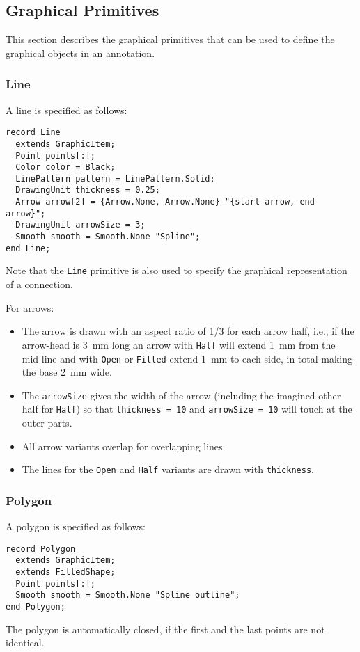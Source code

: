\subsection{Graphical Primitives}\label{graphical-primitives}

This section describes the graphical primitives that can be used to define the graphical objects in an annotation.

\subsubsection{Line}\label{line}

A line is specified as follows:
\begin{lstlisting}[language=modelica]
record Line
  extends GraphicItem;
  Point points[:];
  Color color = Black;
  LinePattern pattern = LinePattern.Solid;
  DrawingUnit thickness = 0.25;
  Arrow arrow[2] = {Arrow.None, Arrow.None} "{start arrow, end arrow}";
  DrawingUnit arrowSize = 3;
  Smooth smooth = Smooth.None "Spline";
end Line;
\end{lstlisting}%
Note that the \lstinline!Line! primitive is also used to specify the graphical representation of a connection.

For arrows:
\begin{itemize}
\item
  The arrow is drawn with an aspect ratio of 1/3 for each arrow half, i.e., if the arrow-head is 3~mm long an arrow with \lstinline!Half! will extend 1~mm from the mid-line and with \lstinline!Open! or \lstinline!Filled! extend 1~mm to each side, in total making the base 2~mm wide.
\item
  The \lstinline!arrowSize! gives the width of the arrow (including the imagined other half for \lstinline!Half!) so that \lstinline!thickness = 10! and \lstinline!arrowSize = 10! will touch at the outer parts.
\item
  All arrow variants overlap for overlapping lines.
\item
  The lines for the \lstinline!Open! and \lstinline!Half! variants are drawn with \lstinline!thickness!.
\end{itemize}

\subsubsection{Polygon}\label{polygon}

A polygon is specified as follows:
\begin{lstlisting}[language=modelica]
record Polygon
  extends GraphicItem;
  extends FilledShape;
  Point points[:];
  Smooth smooth = Smooth.None "Spline outline";
end Polygon;
\end{lstlisting}%
The polygon is automatically closed, if the first and the last points are not identical.

